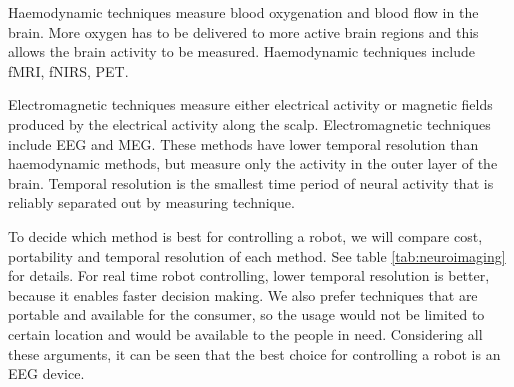 Haemodynamic techniques measure blood oxygenation and blood flow in the brain. More oxygen has to be delivered to more active brain regions and this allows the brain activity to be measured. Haemodynamic techniques include \gls{fMRI}, \gls{fNIRS}, \gls{PET}.

Electromagnetic techniques measure either electrical activity or magnetic fields produced by the electrical activity along the scalp. Electromagnetic techniques include \gls{EEG} and \gls{MEG}. These methods have lower temporal resolution than haemodynamic methods, but measure only the activity in the outer layer of the brain. Temporal resolution is the smallest time period of neural activity that is reliably separated out by measuring technique.

To decide which method is best for controlling a robot, we will compare cost, portability and temporal resolution of each method. See table \ref{tab:neuroimaging} for details. For real time robot controlling, lower temporal resolution is better, because it enables faster decision making. We also prefer techniques that are portable and available for the consumer, so the usage would not be limited to certain location and would be available to the people in need. Considering all these arguments, it can be seen that the best choice for controlling a robot is an \gls{EEG} device.


\newcommand{\pMEG}{\tablefootnote{http://neurogadget.com/2012/12/15/inexpensive-magnetoencephalography-meg-system-could-be-available-at-every-hospital/6495}}
\newcommand{\pfMRI}{\tablefootnote{http://info.blockimaging.com/bid/92623/MRI-Machine-Cost-and-Price-Guide}}
\newcommand{\pPET}{\tablefootnote{http://info.blockimaging.com/bid/68875/How-Much-Does-a-PET-CT-Scanner-Cost}}
\newcommand{\plEEG}{\tablefootnote{http://en.wikipedia.org/wiki/Comparison\_of\_consumer\_brain-computer\_interfaces}}
\newcommand{\phEEG}{\tablefootnote{http://www.brainvision.com/files/actiCHamp-PyCorder-Flyer\_US.pdf}}
\newcommand{\pNIRS}{\cite{NIRS}}
\newcommand{\tresol}{\cite{timeresol}}


